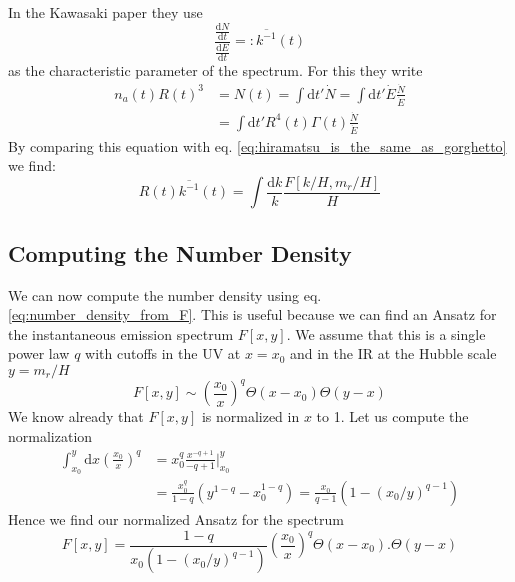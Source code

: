 \documentclass[a4paper]{article}
\begin{document}
In the Kawasaki paper \cite{improved_estimation_hiramatsu} they use 
\begin{equation}
	\frac{\frac{\mathrm{d} N}{\mathrm{d} t}}{\frac{\mathrm{d} E}{\mathrm{d} t}} =: \overline{k^{-1}}(t)
\end{equation}
as the characteristic parameter of the spectrum.
For this they write 
\begin{align}
	n_a(t) R(t)^3 &= N(t) = \int \mathrm{d} t' \dot{N} = \int \mathrm{d} t' \dot{E} \frac{\dot{N}}{\dot{E}} \\
	&= \int \mathrm{d} t' R^4(t) \Gamma(t) \frac{\dot{N}}{\dot{E}}
\end{align}
By comparing this equation with eq. \eqref{eq:hiramatsu_is_the_same_as_gorghetto} we find:
\begin{equation}
	R(t) \overline{k^{-1}}(t) = \int \frac{\mathrm{d} k}{k} \frac{F[k/H, m_r/H]}{H}
\end{equation}

\subsection{Computing the Number Density}
We can now compute the number density using eq. \eqref{eq:number_density_from_F}.
This is useful because we can find an Ansatz for the instantaneous emission spectrum $F[x, y]$.
We assume that this is a single power law $q$ with cutoffs in the UV at $x = x_0$ and in the IR at the Hubble scale $y = m_r/H$
\begin{equation}
	F[x, y] \sim \left(\frac{x_0}{x}\right)^q \Theta(x - x_0) \Theta(y - x)
\end{equation}
We know already that $F[x,y]$ is normalized in $x$ to 1. Let us compute the normalization
\begin{align}
	\int_{x_0}^{y} \mathrm{d} x \left(\frac{x_0}{x}\right)^q &= x_0^q \frac{x^{-q + 1}}{-q + 1}\Big|_{x_0}^y \\
	&= \frac{x_0^q}{1 - q}(y^{1 - q} - x_0^{1 - q}) = \frac{x_0}{q - 1} (1 - (x_0/y)^{q - 1})
\end{align}
Hence we find our normalized Ansatz for the spectrum
\begin{equation}
	F[x, y] = \frac{1 - q}{x_0(1 - (x_0/y)^{q - 1})} \left(\frac{x_0}{x}\right)^q \Theta(x - x_0). \Theta(y - x)
\end{equation}
\end{document}
